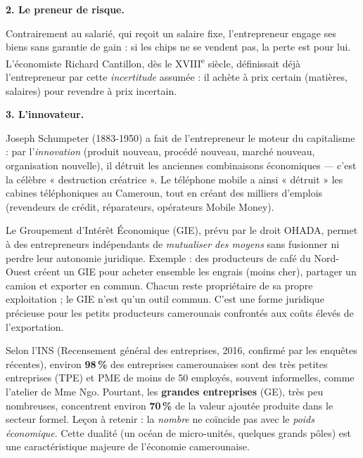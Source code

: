 \documentclass[11pt]{article}
\newcommand{\cle}[1]{{\popxbold\color{popdark}#1}}
\newcounter{popsec}
\newcounter{popsub}
\newcommand{\courssub}[1]{%
  \stepcounter{popsub}%
  \par\vspace{9pt}\noindent{\popxbold\fontsize{11.5}{13}\selectfont\color{popink}{\color{poporange}\thepopsec.\thepopsub}\hspace{6pt}#1}\par\nopagebreak\vspace{4pt}
}
\begin{document}
\textbf{2. Le preneur de risque.}\par
Contrairement au salarié, qui reçoit un salaire fixe, l'entrepreneur engage ses biens sans garantie de gain : si les chips ne se vendent pas, la perte est pour lui. L'économiste Richard Cantillon, dès le XVIII\textsuperscript{e} siècle, définissait déjà l'entrepreneur par cette \emph{incertitude} assumée : il achète à prix certain (matières, salaires) pour revendre à prix incertain.

\textbf{3. L'innovateur.}\par
Joseph \cle{Schumpeter} (1883-1950) a fait de l'entrepreneur le moteur du capitalisme : par l'\emph{innovation} (produit nouveau, procédé nouveau, marché nouveau, organisation nouvelle), il détruit les anciennes combinaisons économiques — c'est la célèbre « \cle{destruction créatrice} ». Le téléphone mobile a ainsi « détruit » les cabines téléphoniques au Cameroun, tout en créant des milliers d'emplois (revendeurs de crédit, réparateurs, opérateurs Mobile Money).

\begin{savaistu}
Le \cle{Groupement d'Intérêt Économique} (GIE), prévu par le droit OHADA, permet à des entrepreneurs indépendants de \emph{mutualiser des moyens} sans fusionner ni perdre leur autonomie juridique. Exemple : des producteurs de café du Nord-Ouest créent un GIE pour acheter ensemble les engrais (moins cher), partager un camion et exporter en commun. Chacun reste propriétaire de sa propre exploitation ; le GIE n'est qu'un outil commun. C'est une forme juridique précieuse pour les petits producteurs camerounais confrontés aux coûts élevés de l'exportation.
\end{savaistu}

\courssub{Le poids réel des entreprises au Cameroun}

\begin{exemplebox}
Selon l'INS (Recensement général des entreprises, 2016, confirmé par les enquêtes récentes), environ \textbf{98\,\%} des entreprises camerounaises sont des \cle{très petites entreprises} (TPE) et \cle{PME} de moins de 50 employés, souvent informelles, comme l'atelier de Mme Ngo. Pourtant, les \textbf{grandes entreprises} (GE), très peu nombreuses, concentrent environ \textbf{70\,\%} de la valeur ajoutée produite dans le secteur formel. Leçon à retenir : la \emph{nombre} ne coïncide pas avec le \emph{poids économique}. Cette dualité (un océan de micro-unités, quelques grands pôles) est une caractéristique majeure de l'économie camerounaise.
\end{exemplebox}
\end{document}
